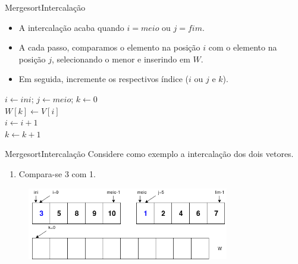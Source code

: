 \documentclass[aspectratio=169]{beamer}
\begin{document}

\begin{frame}[fragile]{Mergesort}{Intercalação}
\begin{itemize}
\item A intercalação acaba quando $i = meio$ ou $j = fim$.
\item A cada passo, comparamos o elemento na posição $i$ com o elemento na posição $j$, selecionando o menor e inserindo em $W$.
\item Em seguida, incremente os respectivos índice ($i$ ou $j$ e $k$).
\end{itemize}

\begin{algorithm}[H]
	$i \leftarrow ini$; 
	$j \leftarrow meio$;
	$k \leftarrow 0$\\
	 {
		 {
			$W[k] \leftarrow V[i]$ \\
			$i \leftarrow i + 1$\\
		}
		$k \leftarrow k +1$
	}
\end{algorithm}
\end{frame}


\begin{frame}{Mergesort}{Intercalação}
Considere como exemplo a intercalação dos dois vetores. 
\begin{enumerate}
 \item Compara-se 3 com 1. 
\end{enumerate}

\begin{figure}[!h]
  \centering
  \includegraphics[width=250pt]{imgs/merge/merge1.png}
  \label{fig_merge1}
\end{figure}
\end{frame}

\end{document}
